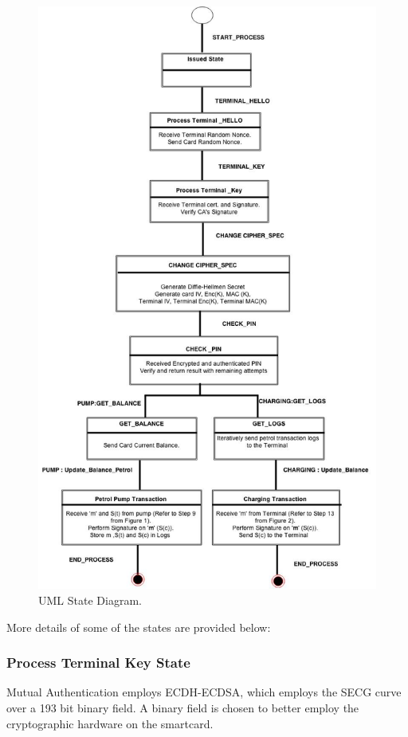 \documentclass[a4paper,10pt]{llncs}
\begin{document}
    \begin{figure}
      \centering
      \includegraphics[scale=0.38]{img/state2.jpg}
      \caption{\label{figure:state}UML State Diagram.}
    \end{figure}



More details of some of the states are provided below:
\subsubsection{Process Terminal Key State}
Mutual Authentication employs ECDH-ECDSA, which employs the SECG curve over a 193 bit binary field. A binary field is chosen to better employ the cryptographic hardware on the smartcard.
\end{document}
